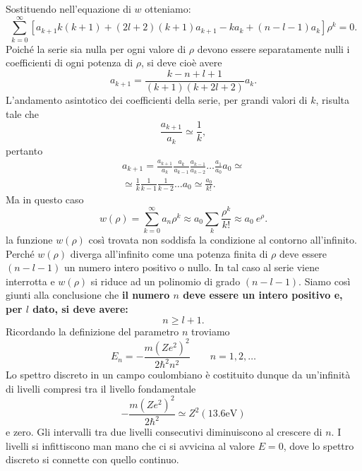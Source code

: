 Sostituendo nell'equazione di $w$ otteniamo:
\begin{equation}
\sum_{k=0}^\infty\left[a_{k+1}k\left(k+1\right)+\left(2l+2\right)\left(k+1\right)a_{k+1}-ka_k+\left(n-l-1\right)a_k\right]\rho^k=0 .
\end{equation}
Poiché la serie sia nulla per ogni valore di $\rho$ devono essere separatamente nulli i coefficienti di ogni potenza di $\rho$, si deve cioè avere
\begin{equation}
a_{k+1}=\frac{k-n+l+1}{\left(k+1\right)\left(k+2l+2\right)}a_k .
\end{equation}
L'andamento asintotico dei coefficienti della serie, per grandi valori di $k$, risulta tale che
\begin{equation}
\frac{a_{k+1}}{a_k}\simeq \frac{1}{k},
\end{equation}
pertanto
\begin{eqnarray}
a_{k+1}=\frac{a_{k+1}}{a_{k}}\frac{a_{k}}{a_{k-1}}\frac{a_{k-1}}{a_{k-2}}\dots \frac{a_{1}}{a_{0}}a_0 \simeq \nonumber \\
\simeq \frac{1}{k} \frac{1}{k-1}\frac{1}{k-2}\dots a_0\simeq \frac{a_0}{k!}  .
\end{eqnarray}
Ma in questo caso
\begin{equation}
w(\rho) =\sum _{k=0} ^{\infty} a_n\rho ^k \approx a_0 \sum _k \frac{\rho ^k}{k!} \approx a_0\ e^{\rho}.
\end{equation}
la funzione $w (\rho )$ così trovata non soddisfa la condizione al contorno all'infinito. Perché $w(\rho )$ diverga all'infinito come una potenza finita di $\rho$ deve essere $(n-l-1)$ un numero intero positivo o nullo. In tal caso al serie viene interrotta e $w (\rho )$ si riduce ad un polinomio di grado $(n-l-1)$. Siamo così giunti alla conclusione che \textbf{il numero $n$ deve essere un intero positivo e, per $l$ dato, si deve avere:}
\begin{equation}
n \geq l+1.
\end{equation}
Ricordando la definizione del parametro $n$ troviamo
\begin{equation}
E_n= -\frac{m\left(Ze^2\right) ^2}{2\hbar ^2 n^2}\qquad n=1,2,\dots
\end{equation}
Lo spettro discreto in un campo coulombiano è costituito dunque da un'infinità di livelli compresi tra il livello fondamentale
\begin{equation}
-\frac{m\left(Ze^2\right) ^2}{2\hbar ^2 }\simeq Z^2 \left(13.6 \textrm{eV}\right)
\end{equation}
e zero. Gli intervalli tra due livelli consecutivi diminuiscono al crescere di $n$. I livelli si infittiscono man mano che ci si avvicina al valore $E=0$, dove lo spettro discreto si connette con quello continuo.\\
